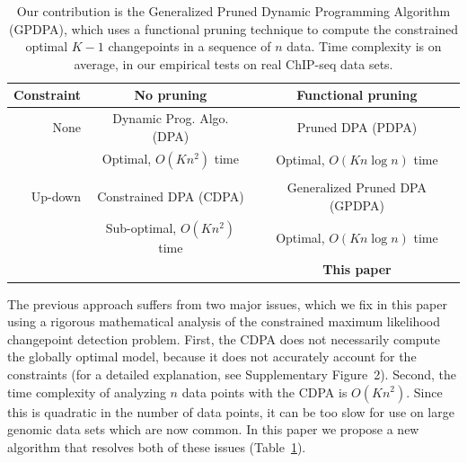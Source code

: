 \documentclass[aoas]{imsart}
\begin{document}

\begin{table}[t!]
  \centering
  \begin{tabular}{r|c|c}
    Constraint & No pruning & Functional pruning \\
    \hline
    None & Dynamic Prog. Algo. (DPA) & Pruned DPA (PDPA) \\
    & Optimal, $O(Kn^2)$ time & Optimal, $O(Kn\log n)$ time\\
    & \citet{segment-neighborhood}     & \citet{pruned-dp, phd-johnson} \\
    \hline
    Up-down & Constrained DPA (CDPA) & Generalized Pruned DPA (GPDPA) \\
    & Sub-optimal, $O(Kn^2)$ time & Optimal, $O(Kn\log n)$ time\\
    & \citet{HOCKING-PeakSeg} & \textbf{This paper} \\
    \hline
  \end{tabular}
  \caption{Our contribution is 
the Generalized Pruned Dynamic Programming Algorithm (GPDPA), 
 which uses a functional pruning technique 
    to compute the constrained optimal $K-1$ changepoints 
in a sequence of $n$ data. 
Time complexity is on average, 
in our empirical tests on real ChIP-seq data sets.}
\label{tab:contribution}
\end{table}

The previous approach suffers from two major issues, which we fix in
this paper using a rigorous mathematical analysis of the constrained
maximum likelihood changepoint detection problem. First, the CDPA does
not necessarily compute the globally optimal model, because it does
not accurately account for the constraints (for a detailed
explanation, see Supplementary Figure~2). Second, the time complexity
of analyzing $n$ data points with the CDPA is $O(Kn^2)$. Since this is quadratic in the number of
data points, it can be too slow for use on large genomic data sets
which are now common. In this paper we propose a new algorithm that
resolves both of these issues (Table~\ref{tab:contribution}).
\end{document}
